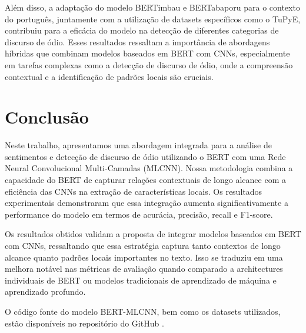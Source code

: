 \documentclass[sigconf,nonacm]{acmart}
\begin{document}
Além disso, a adaptação do modelo BERTimbau e BERTabaporu para o contexto do português, juntamente com a utilização de datasets específicos como o TuPyE,
contribuiu para a eficácia do modelo na detecção de diferentes categorias de discurso de ódio.
Esses resultados ressaltam a importância de abordagens híbridas que combinam modelos baseados em BERT com CNNs,
especialmente em tarefas complexas como a detecção de discurso de ódio, onde a compreensão contextual e a identificação de padrões locais são cruciais.

\section{Conclusão}

Neste trabalho, apresentamos uma abordagem integrada para a análise de sentimentos e detecção de discurso de ódio utilizando o BERT com uma Rede Neural Convolucional Multi-Camadas (MLCNN). 
Nossa metodologia combina a capacidade do BERT de capturar relações contextuais de longo alcance com a eficiência das CNNs na extração de características locais. 
Os resultados experimentais demonstraram que essa integração aumenta significativamente a performance do modelo em termos de acurácia, precisão, recall e F1-score.

Os resultados obtidos validam a proposta de integrar modelos baseados em BERT com CNNs, ressaltando que essa estratégia captura tanto contextos de longo alcance quanto padrões locais importantes no texto. 
Isso se traduziu em uma melhora notável nas métricas de avaliação quando comparado a architectures individuais de BERT ou modelos tradicionais de aprendizado de máquina e aprendizado profundo.

O código fonte do modelo BERT-MLCNN, bem como os datasets utilizados, estão disponíveis no repositório do GitHub \cite{github_repo}.


\end{document}
